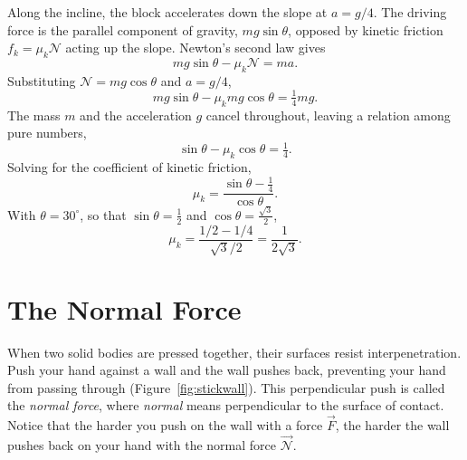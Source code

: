\begin{workedexample}
Along the incline, the block accelerates down the slope at $a = g/4$. The driving force is
the parallel component of gravity, $mg\sin\theta$, opposed by kinetic friction
$f_k = \mu_k\mathscr{N}$ acting up the slope. Newton's second law gives
\begin{equation*}
    mg\sin\theta - \mu_k\mathscr{N} = ma.
\end{equation*}
Substituting $\mathscr{N} = mg\cos\theta$ and $a = g/4$,
\begin{equation*}
    mg\sin\theta - \mu_k mg\cos\theta = \tfrac{1}{4}mg.
\end{equation*}
The mass $m$ and the acceleration $g$ cancel throughout, leaving a relation among pure
numbers,
\begin{equation*}
    \sin\theta - \mu_k\cos\theta = \tfrac{1}{4}.
\end{equation*}
Solving for the coefficient of kinetic friction,
\begin{equation*}
    \mu_k = \frac{\sin\theta - \tfrac{1}{4}}{\cos\theta}.
\end{equation*}
With $\theta = 30^\circ$, so that $\sin\theta = \tfrac{1}{2}$ and $\cos\theta = \tfrac{\sqrt{3}}{2}$,
\begin{equation*}
    \mu_k = \frac{1/2 - 1/4}{\sqrt{3}/2}
          = \frac{1}{2\sqrt{3}}.
\end{equation*}



\end{workedexample}


\newpage


\section*{The Normal Force}

When two solid bodies are pressed together, their surfaces resist interpenetration.
Push your hand against a wall and the wall pushes back, preventing your hand from
passing through (Figure~\ref{fig:stickwall}). This perpendicular push is called the
\textit{normal force}, where \textit{normal} means perpendicular to the surface of
contact. Notice that the harder you push on the wall with a force $\vec{F}$, the harder
the wall pushes back on your hand with the normal force $\vec{\mathscr{N}}$.

